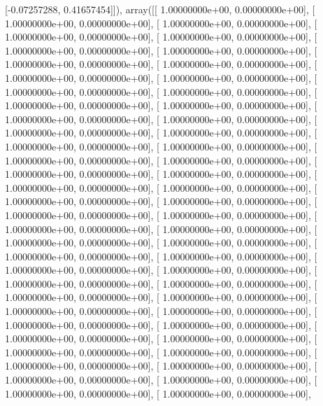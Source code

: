 \documentclass{article}
\begin{document}
       [-0.07257288,  0.41657454]]), array([[  1.00000000e+00,   0.00000000e+00],
       [  1.00000000e+00,   0.00000000e+00],
       [  1.00000000e+00,   0.00000000e+00],
       [  1.00000000e+00,   0.00000000e+00],
       [  1.00000000e+00,   0.00000000e+00],
       [  1.00000000e+00,   0.00000000e+00],
       [  1.00000000e+00,   0.00000000e+00],
       [  1.00000000e+00,   0.00000000e+00],
       [  1.00000000e+00,   0.00000000e+00],
       [  1.00000000e+00,   0.00000000e+00],
       [  1.00000000e+00,   0.00000000e+00],
       [  1.00000000e+00,   0.00000000e+00],
       [  1.00000000e+00,   0.00000000e+00],
       [  1.00000000e+00,   0.00000000e+00],
       [  1.00000000e+00,   0.00000000e+00],
       [  1.00000000e+00,   0.00000000e+00],
       [  1.00000000e+00,   0.00000000e+00],
       [  1.00000000e+00,   0.00000000e+00],
       [  1.00000000e+00,   0.00000000e+00],
       [  1.00000000e+00,   0.00000000e+00],
       [  1.00000000e+00,   0.00000000e+00],
       [  1.00000000e+00,   0.00000000e+00],
       [  1.00000000e+00,   0.00000000e+00],
       [  1.00000000e+00,   0.00000000e+00],
       [  1.00000000e+00,   0.00000000e+00],
       [  1.00000000e+00,   0.00000000e+00],
       [  1.00000000e+00,   0.00000000e+00],
       [  1.00000000e+00,   0.00000000e+00],
       [  1.00000000e+00,   0.00000000e+00],
       [  1.00000000e+00,   0.00000000e+00],
       [  1.00000000e+00,   0.00000000e+00],
       [  1.00000000e+00,   0.00000000e+00],
       [  1.00000000e+00,   0.00000000e+00],
       [  1.00000000e+00,   0.00000000e+00],
       [  1.00000000e+00,   0.00000000e+00],
       [  1.00000000e+00,   0.00000000e+00],
       [  1.00000000e+00,   0.00000000e+00],
       [  1.00000000e+00,   0.00000000e+00],
       [  1.00000000e+00,   0.00000000e+00],
       [  1.00000000e+00,   0.00000000e+00],
       [  1.00000000e+00,   0.00000000e+00],
       [  1.00000000e+00,   0.00000000e+00],
       [  1.00000000e+00,   0.00000000e+00],
       [  1.00000000e+00,   0.00000000e+00],
       [  1.00000000e+00,   0.00000000e+00],
       [  1.00000000e+00,   0.00000000e+00],
       [  1.00000000e+00,   0.00000000e+00],
       [  1.00000000e+00,   0.00000000e+00],
       [  1.00000000e+00,   0.00000000e+00],
       [  1.00000000e+00,   0.00000000e+00],
       [  1.00000000e+00,   0.00000000e+00],
       [  1.00000000e+00,   0.00000000e+00],
       [  1.00000000e+00,   0.00000000e+00],
       [  1.00000000e+00,   0.00000000e+00],
       [  1.00000000e+00,   0.00000000e+00],
       [  1.00000000e+00,   0.00000000e+00],
       [  1.00000000e+00,   0.00000000e+00],
\end{document}
